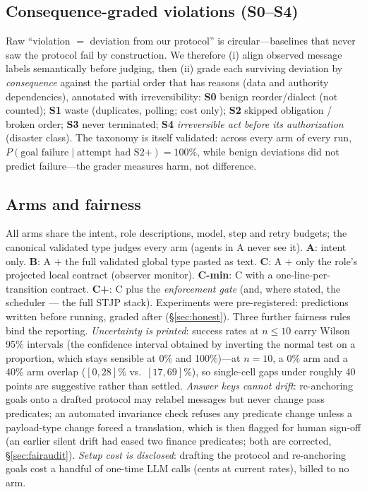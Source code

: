 \documentclass{article}
\newcommand{\stjp}{\textsc{STJP}}
\begin{document}
\subsection{Consequence-graded violations (S0--S4)}
Raw ``violation $=$ deviation from our protocol'' is circular---baselines that never saw the protocol fail by construction. We therefore (i) align observed message labels semantically before judging, then (ii) grade each surviving deviation by \emph{consequence} against the partial order that has reasons (data and authority dependencies), annotated with irreversibility: \textbf{S0} benign reorder/dialect (not counted); \textbf{S1} waste (duplicates, polling; cost only); \textbf{S2} skipped obligation / broken order; \textbf{S3} never terminated; \textbf{S4} \emph{irreversible act before its authorization} (disaster class). The taxonomy is itself validated: across every arm of every run, $P(\text{goal failure}\mid\text{attempt had S2+})=100\%$, while benign deviations did not predict failure---the grader measures harm, not difference.

\subsection{Arms and fairness}
All arms share the intent, role descriptions, model, step and retry budgets; the canonical validated type judges every arm (agents in A never see it). \textbf{A}: intent only. \textbf{B}: A $+$ the full validated global type pasted as text. \textbf{C}: A $+$ only the role's projected local contract (observer monitor). \textbf{C-min}: C with a one-line-per-transition contract. \textbf{C+}: C plus the \emph{enforcement gate} (and, where stated, the scheduler --- the full \stjp{} stack). Experiments were pre-registered: predictions written before running, graded after (\S\ref{sec:honest}). Three further fairness rules bind the reporting. \emph{Uncertainty is printed}: success rates at $n{\leq}10$ carry Wilson 95\% intervals (the confidence interval obtained by inverting the normal test on a proportion, which stays sensible at 0\% and 100\%)---at $n{=}10$, a 0\% arm and a 40\% arm overlap ($[0,28]\%$ vs.\ $[17,69]\%$), so single-cell gaps under roughly 40 points are suggestive rather than settled. \emph{Answer keys cannot drift}: re-anchoring goals onto a drafted protocol may relabel messages but never change pass predicates; an automated invariance check refuses any predicate change unless a payload-type change forced a translation, which is then flagged for human sign-off (an earlier silent drift had eased two finance predicates; both are corrected, \S\ref{sec:fairaudit}). \emph{Setup cost is disclosed}: drafting the protocol and re-anchoring goals cost a handful of one-time LLM calls (cents at current rates), billed to no arm.
\end{document}
